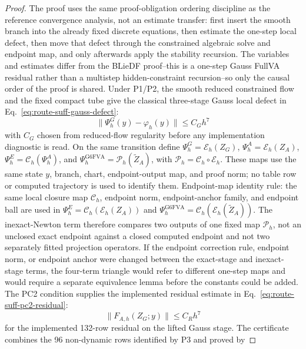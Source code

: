 \documentclass[preprint,12pt]{elsarticle}
\begin{document}
\begin{proof}
The proof uses the same proof-obligation ordering discipline as the reference
convergence analysis, not an estimate transfer: first insert the smooth branch
into the already fixed discrete equations, then estimate the one-step local
defect, then move that defect through the constrained algebraic solve and
endpoint map, and only afterwards apply the stability recursion.  The
variables and estimates differ from the BLieDF proof--this is a one-step
Gauss FullVA residual rather than a multistep hidden-constraint recursion--so
only the causal order of the proof is shared.
Under P1/P2, the smooth reduced constrained flow and the fixed compact tube
give the classical three-stage Gauss local defect in
Eq.~\eqref{eq:route-suff-gauss-defect}:
\begin{equation}
\label{eq:route-suff-gauss-defect}
  \|\Psi_h^G(y)-\varphi_h(y)\|\le C_Gh^7
\end{equation}
with \(C_G\) chosen from reduced-flow regularity before any implementation
diagnostic is read.  On the same transition define
\(\Psi_h^G=\mathcal E_h(Z_G)\),
\(\Psi_h^A=\mathcal E_h(Z_A)\),
\(\Psi_h^E=\mathcal C_h(\Psi_h^A)\), and
\(\Psi_h^{\mathrm{G6FVA}}=\mathcal P_h(\widetilde Z_A)\), with
\(\mathcal P_h=\mathcal C_h\circ\mathcal E_h\).  These maps use the same
state \(y\), branch, chart, endpoint-output map, and proof norm; no table row
or computed trajectory is used to identify them.
Endpoint-map identity rule: the same local closure map \(\mathcal C_h\),
endpoint norm, endpoint-anchor family, and endpoint ball are used in
\(\Psi_h^E=\mathcal C_h(\mathcal E_h(Z_A))\) and
\(\Psi_h^{\mathrm{G6FVA}}=\mathcal C_h(\mathcal E_h(\widetilde Z_A))\).
The inexact-Newton term therefore compares two outputs of one fixed map
\(\mathcal P_h\), not an unclosed exact endpoint against a closed computed
endpoint and not two separately fitted projection operators.  If the
endpoint correction rule, endpoint norm, or endpoint anchor were changed
between the exact-stage and inexact-stage terms, the four-term triangle would
refer to different one-step maps and would require a separate equivalence
lemma before the constants could be added.
The PC2 condition supplies the implemented residual estimate in
Eq.~\eqref{eq:route-suff-pc2-residual}:
\begin{equation}
\label{eq:route-suff-pc2-residual}
  \|F_{A,h}(Z_G;y)\|\le C_R h^7
\end{equation}
for the implemented 132-row residual on the lifted Gauss stage.  The
certificate combines the 96 non-dynamic rows identified by P3 and proved by

\end{proof}
\end{document}
